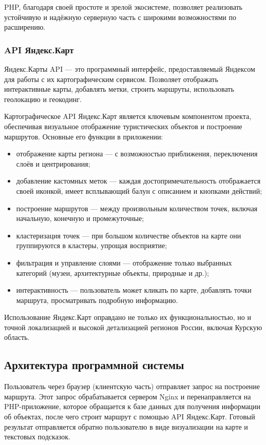 PHP, благодаря своей простоте и зрелой экосистеме, позволяет реализовать устойчивую и надёжную серверную часть с широкими возможностями по расширению.

\subsubsection{API Яндекс.Карт}

Яндекс.Карты API — это программный интерфейс, предоставляемый Яндексом для работы с их картографическим сервисом. Позволяет отображать интерактивные карты, добавлять метки, строить маршруты, использовать геолокацию и геокодинг.

Картографическое API Яндекс.Карт является ключевым компонентом проекта, обеспечивая визуальное отображение туристических объектов и построение маршрутов. Основные его функции в приложении:
\begin{itemize}
	\item отображение карты региона — с возможностью приближения, переключения слоёв и центрирования;
	\item добавление кастомных меток — каждая достопримечательность отображается своей иконкой, имеет всплывающий балун с описанием и кнопками действий;
	\item построение маршрутов — между произвольным количеством точек, включая начальную, конечную и промежуточные;
	\item кластеризация точек — при большом количестве объектов на карте они группируются в кластеры, упрощая восприятие;
	\item фильтрация и управление слоями — отображение только выбранных категорий (музеи, архитектурные объекты, природные и др.);
	\item интерактивность — пользователь может кликать по карте, добавлять точки маршрута, просматривать подробную информацию.
\end{itemize}

Использование Яндекс.Карт оправдано не только их функциональностью, но и точной локализацией и высокой детализацией регионов России, включая Курскую область.

\subsection{Архитектура программной системы}

Пользователь через браузер (клиентскую часть) отправляет запрос на построение маршрута. Этот запрос обрабатывается сервером Nginx и перенаправляется на PHP-приложение, которое обращается к базе данных\cite{b14} для получения информации об объектах, после чего строит маршрут с помощью API Яндекс.Карт. Готовый результат отправляется обратно пользователю в виде визуализации на карте и текстовых подсказок.

